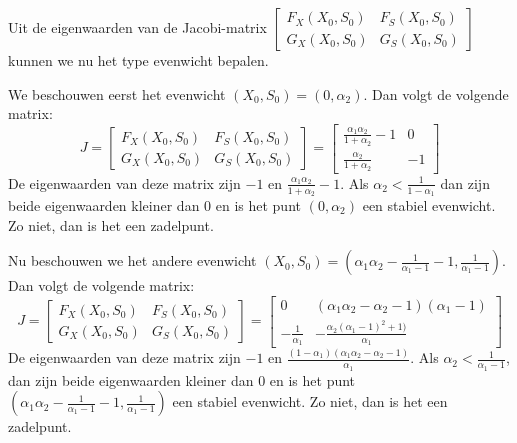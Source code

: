 Uit de eigenwaarden van de Jacobi-matrix $\left[ \begin{array}{cc}
F_X(X_0,S_0) & F_S(X_0,S_0) \\
G_X(X_0,S_0) & G_S(X_0,S_0) \end{array} \right]$ kunnen we nu het type evenwicht bepalen.

We beschouwen eerst het evenwicht $(X_0, S_0) = (0, \alpha_2)$. Dan volgt de volgende matrix:
\[J = \left[ \begin{array}{cc}
F_X(X_0,S_0) & F_S(X_0,S_0) \\
G_X(X_0,S_0) & G_S(X_0,S_0) \end{array} \right] =
\left[ \begin{array}{cc}
\frac{\alpha_1\alpha_2}{1+\alpha_2}-1 & 0 \\
\frac{\alpha_2}{1+\alpha_2} & -1 \end{array} \right]\]
De eigenwaarden van deze matrix zijn $-1$ en $\frac{\alpha_1\alpha_2}{1+\alpha_2}-1$. Als $\alpha_2 < \frac{1}{1-\alpha_1}$ dan zijn beide eigenwaarden kleiner dan 0 en is het punt $(0, \alpha_2)$ een stabiel evenwicht. Zo niet, dan is het een zadelpunt.

Nu beschouwen we het andere evenwicht $(X_0, S_0) = \left( \alpha_1\alpha_2-\frac{1}{\alpha_1-1}-1,\frac{1}{\alpha_1-1} \right)$. Dan volgt de volgende matrix:
\[J = \left[ \begin{array}{cc}
F_X(X_0,S_0) & F_S(X_0,S_0) \\
G_X(X_0,S_0) & G_S(X_0,S_0) \end{array} \right] =
\left[ \begin{array}{cc}
0 & (\alpha_1\alpha_2-\alpha_2-1)(\alpha_1-1) \\
-\frac{1}{\alpha_1} & -\frac{\alpha_2(\alpha_1-1)^2+1)}{\alpha_1} \end{array} \right]
\]
De eigenwaarden van deze matrix zijn $-1$ en $\frac{(1-\alpha_1)(\alpha_1\alpha_2-\alpha_2-1)}{\alpha_1}$. Als $\alpha_2<\frac{1}{\alpha_1-1}$, dan zijn beide eigenwaarden kleiner dan 0 en is het punt $(\alpha_1\alpha_2-\frac{1}{\alpha_1-1}-1,\frac{1}{\alpha_1-1})$ een stabiel evenwicht. Zo niet, dan is het een zadelpunt.